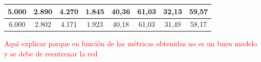 \begin{table}[ht]
\begin{tabular}{|c|c|c|c|c|c|c|c|}
5.000               & 2.890       & 4.270       & 1.845       & 40,36                                                             & 61,03                                                          & 32,13                                                               & 59,57                                                             \\ \hline
6.000               & 2.802       & 4.171       & 1.923       & 40,18                                                             & 61,03                                                          & 31,49                                                               & 58,17                                                             \\ \hline
\end{tabular}
\end{table}

\textcolor{red}{Aquí explicar porque en función de las métricas obtenidas no es un buen modelo y se debe de reentrenar la red}

\newpage

